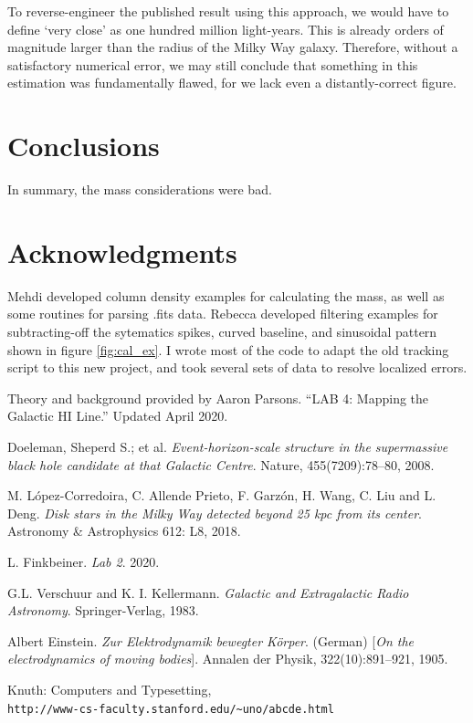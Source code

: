 \documentclass[12pt]{article}
\begin{document}
To reverse-engineer the published result using this approach, we would have to define `very close' as one hundred million light-years. This is already orders of magnitude larger than the radius of the Milky Way galaxy. Therefore, without a satisfactory numerical error, we may still conclude that something in this estimation was fundamentally flawed, for we lack even a distantly-correct figure.

\section{Conclusions}

\quad \quad In summary, the mass considerations were bad.

\section{Acknowledgments}

\quad \quad Mehdi developed column density examples for calculating the mass, as well as some routines for parsing .fits data. Rebecca developed filtering examples for subtracting-off the sytematics spikes, curved baseline, and sinusoidal pattern shown in figure \ref{fig:cal_ex}. I wrote most of the code to adapt the old tracking script to this new project, and took several sets of data to resolve localized errors.

Theory and background provided by Aaron Parsons. ``LAB 4: Mapping the Galactic HI Line.'' Updated April 2020.


\begin{thebibliography}{9}

Doeleman, Sheperd S.; et al.
\textit{Event-horizon-scale structure in the supermassive black hole candidate at that Galactic Centre}.
Nature, 455(7209):78–80, 2008.

M. L\'{o}pez-Corredoira, C. Allende Prieto, F. Garzón, H. Wang, C. Liu and L. Deng.
\textit{Disk stars in the Milky Way detected beyond 25 kpc from its center}.
Astronomy \& Astrophysics 612: L8, 2018. 

L. Finkbeiner.
\textit{Lab 2}.
2020.

G.L. Verschuur and K. I. Kellermann. 
\textit{Galactic and Extragalactic Radio Astronomy}. 
Springer-Verlag, 1983.

Albert Einstein. 
\textit{Zur Elektrodynamik bewegter K{\"o}rper}. (German) 
[\textit{On the electrodynamics of moving bodies}]. 
Annalen der Physik, 322(10):891–921, 1905.

Knuth: Computers and Typesetting,
\\\texttt{http://www-cs-faculty.stanford.edu/\~{}uno/abcde.html}
\end{thebibliography}
\end{document}

